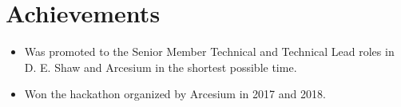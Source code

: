 \documentclass[letterpaper,11pt]{article}
\newcommand{\resumeSubHeadingListStart}{\begin{itemize}[leftmargin=*]}
\newcommand{\resumeItemListEnd}{\end{itemize}\vspace{-5pt}}
\begin{document}
\section{Achievements}
  \resumeSubHeadingListStart
    \item{
      Was promoted to the Senior Member Technical and Technical Lead roles in D. E. Shaw and Arcesium in the shortest possible time.
    }
    \item{
      Won the hackathon organized by Arcesium in 2017 and 2018.
    }
  \resumeItemListEnd

\end{document}
